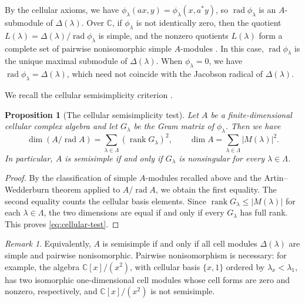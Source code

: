 \documentclass[11pt,a4paper]{amsart}
\newtheorem{proposition}[theorem]{Proposition}
\theoremstyle{uprightdefinition}
\theoremstyle{remark}\newtheorem{remark}[theorem]{Remark}
\begin{document}
By the cellular axioms, we have
$\phi_\lambda(ax,y)=\phi_\lambda(x,a^*y)$,
so $\operatorname{rad}\phi_\lambda$ is an $A$-submodule of $\Delta(\lambda)$. Over $\mathbb C$, if
$\phi_\lambda$ is not identically zero, then the quotient
$L(\lambda)=\Delta(\lambda)/\operatorname{rad}\phi_\lambda$
is simple, and the nonzero quotients $L(\lambda)$ form a complete set of pairwise nonisomorphic simple $A$-modules
\cite[Proposition~3.2 and Theorem~3.4]{GL1996}. In this case, $\operatorname{rad}\phi_\lambda$
is the unique maximal submodule of $\Delta(\lambda)$. When $\phi_\lambda=0$,
we have $\operatorname{rad}\phi_\lambda=\Delta(\lambda)$, which need not coincide
with the Jacobson radical of $\Delta(\lambda)$.

We recall the cellular semisimplicity criterion
\cite[Theorem~3.8]{GL1996}.
\begin{proposition}[The cellular semisimplicity test]
\label{prop:cellular-test-expanded}
Let $A$ be a finite-dimensional cellular complex algebra and let
$G_\lambda$ be the Gram matrix of $\phi_\lambda$. Then we have
\[
 \dim(A/\operatorname{rad}A)=\sum_{\lambda\in\Lambda}
               (\operatorname{rank}G_\lambda)^2,
 \qquad
 \dim A=\sum_{\lambda\in\Lambda}|M(\lambda)|^2.
\]
In particular, $A$ is semisimple if and only if $G_\lambda$
is nonsingular for every $\lambda\in\Lambda$.
\end{proposition}
\begin{proof}
By the classification of simple $A$-modules recalled above and the Artin--Wedderburn theorem applied to $A/\operatorname{rad}A$, we obtain the first equality.
The second equality counts the cellular basis elements. Since
$\operatorname{rank}G_\lambda\le |M(\lambda)|$ for each $\lambda\in\Lambda$, the two
dimensions are equal if and only if every $G_\lambda$ has full rank. This proves
\eqref{eq:cellular-test}.
\end{proof}

\begin{remark}\label{rem:simple-cell-caution}
Equivalently, $A$ is semisimple if and only if all cell modules $\Delta(\lambda)$ are simple and pairwise nonisomorphic.
Pairwise nonisomorphism is necessary: for example, the algebra
$\mathbb C[x]/(x^2)$, with cellular basis $\{x,1\}$ ordered by $\lambda_x<\lambda_1$,
has two isomorphic one-dimensional cell modules whose cell forms are zero and nonzero, respectively, and $\mathbb C[x]/(x^2)$ is not
semisimple.
\end{remark}
\end{document}
